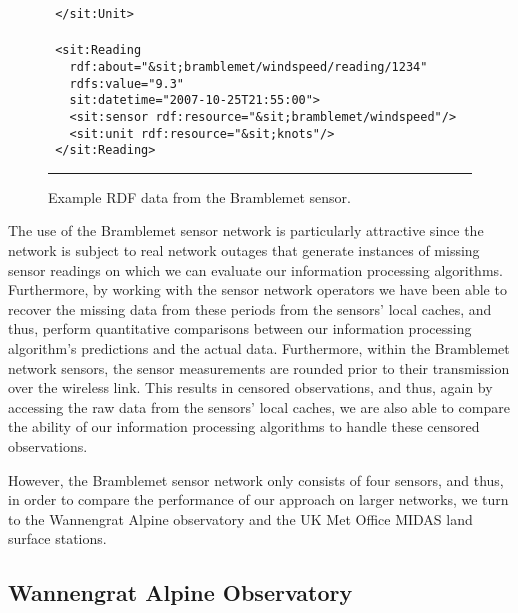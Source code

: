 \documentclass{acmtrans2m}
\begin{document}
\begin{figure}
\begin{minipage}{2.6in}
\begin{tabbing}
\tt\scriptsize \ </\color{red}sit:Unit\color{black}>\\
\\
\tt\scriptsize \ <\color{red}sit:Reading\color{black}\\
\tt\scriptsize \ \ \ rdf:about=\color{blue}"\&sit;bramblemet/windspeed/reading/1234"\color{black}\\
\tt\scriptsize \ \ \ rdfs:value=\color{blue}"9.3"\color{black}\\
\tt\scriptsize \ \ \ sit:datetime=\color{blue}"2007-10-25T21:55:00"\color{black}>\\
\tt\scriptsize \ \ \ <\color{red}sit:sensor\color{black}~rdf:resource=\color{blue}"\&sit;bramblemet/windspeed"\color{black}/>\\
\tt\scriptsize \ \ \ <\color{red}sit:unit\color{black}~rdf:resource=\color{blue}"\&sit;knots"\color{black}/>\\
\tt\scriptsize \ </\color{red}sit:Reading\color{black}>\\
\normalsize
\end{tabbing}
\end{minipage}\par
\rule{3.3in}{.005in} 
\caption{Example RDF data from the Bramblemet sensor.}
\label{rdf}
\end{figure}

The use of the Bramblemet sensor network is particularly attractive since the network is subject to real network outages that generate instances of missing sensor readings on which we can evaluate our information processing algorithms. Furthermore, by working with the sensor network operators we have been able to recover the missing data from these periods from the sensors' local caches, and thus, perform quantitative comparisons between our information processing algorithm's predictions and the actual data. Furthermore, within the Bramblemet network sensors, the sensor measurements are rounded prior to their transmission over the wireless link. This results in censored observations, and thus, again by accessing the raw data from the sensors' local caches, we are also able to compare the ability of our information processing algorithms to handle these censored observations.

However, the Bramblemet sensor network only consists of four sensors, and thus, in order to compare the performance of our approach on larger networks, we turn to the Wannengrat Alpine observatory and the UK Met Office MIDAS land surface stations.

\subsection{Wannengrat Alpine Observatory}
\end{document}
